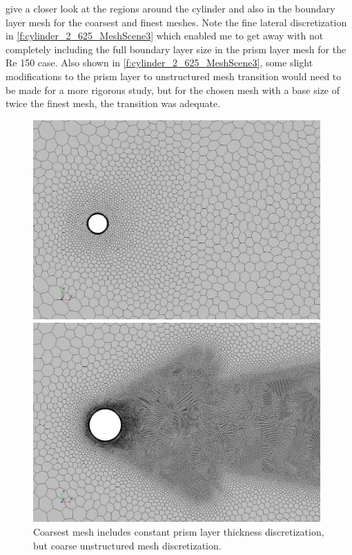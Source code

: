 \documentclass[10pt,english]{article}
\begin{document}
\newpage
{} give a closer look at the regions around the cylinder and also in the boundary layer mesh for the coarsest and finest meshes.  Note the fine lateral discretization in \cref{f:cylinder_2_625_MeshScene3} which enabled me to get away with not completely including the full boundary layer size in the prism layer mesh for the Re 150 case.  Also shown in \cref{f:cylinder_2_625_MeshScene3}, some slight modifications to the prism layer to unstructured mesh transition would need to be made for a more rigorous study, but for the chosen mesh with a base size of twice the finest mesh, the transition was adequate.  

\begin{figure}[h]
\centering
\begin{minipage}{.49\textwidth}
  \centering
\includegraphics[trim={6.0cm 6cm 13.4cm 6.2cm},clip,width=0.98\textwidth]{cylinder_2_1_MeshScene2_2.png}
\caption{Coarsest mesh includes constant prism layer thickness discretization, but coarse unstructured mesh discretization.}
\label{f:cylinder_2_1_MeshScene2_2}
\end{minipage}%
\hspace{5pt}
\begin{minipage}{.49\textwidth}
  \centering
\includegraphics[trim={2.0cm 0cm 2.9cm .5cm},clip,width=0.98\textwidth]{cylinder_2_625_MeshScene2_2.png}

\end{minipage}
\end{figure}
\end{document}
